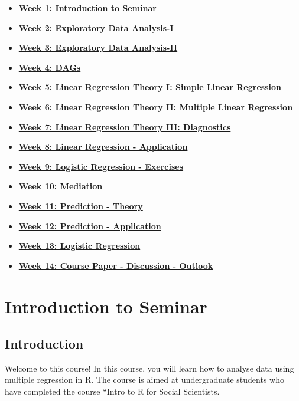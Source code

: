 \documentclass[
]{book}
\providecommand{\tightlist}{%
  \setlength{\itemsep}{0pt}\setlength{\parskip}{0pt}}
\begin{document}
\begin{itemize}
\tightlist
\item
  \textbf{\protect\hyperlink{intro-sem}{Week 1: Introduction to Seminar}}
\item
  \textbf{\protect\hyperlink{eda-1}{Week 2: Exploratory Data Analysis-I}}
\item
  \textbf{\protect\hyperlink{eda-2}{Week 3: Exploratory Data Analysis-II}}
\item
  \textbf{\protect\hyperlink{dags-1}{Week 4: DAGs}}
\item
  \textbf{\protect\hyperlink{lin-t-1}{Week 5: Linear Regression Theory I: Simple Linear Regression}}
\item
  \textbf{\protect\hyperlink{lin-t-2}{Week 6: Linear Regression Theory II: Multiple Linear Regression}}
\item
  \textbf{\protect\hyperlink{lin-t-3}{Week 7: Linear Regression Theory III: Diagnostics}}
\item
  \textbf{\protect\hyperlink{lin-a}{Week 8: Linear Regression - Application}}
\item
  \textbf{\protect\hyperlink{lin-e}{Week 9: Logistic Regression - Exercises}}
\item
  \textbf{\protect\hyperlink{med}{Week 10: Mediation}}
\item
  \textbf{\protect\hyperlink{pm-t}{Week 11: Prediction - Theory}}
\item
  \textbf{\protect\hyperlink{pm-a}{Week 12: Prediction - Application}}
\item
  \textbf{\protect\hyperlink{log-est}{Week 13: Logistic Regression}}
\item
  \textbf{\protect\hyperlink{out-look}{Week 14: Course Paper - Discussion - Outlook}}
\end{itemize}

\hypertarget{intro-sem}{%
\chapter{Introduction to Seminar}\label{intro-sem}}

\hypertarget{introduction}{%
\section{Introduction}\label{introduction}}

Welcome to this course! In this course, you will learn how to analyse data using multiple regression in R. The course is aimed at undergraduate students who have completed the course ``Intro to R for Social Scientists.
\end{document}
